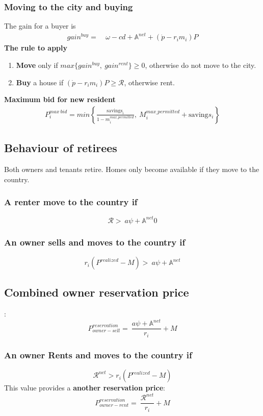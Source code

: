 {\subsubsection{Moving to the city and  buying}
The gain for a buyer is 
\begin{align}
gain^{buy}=&\ \omega-cd+\mathbb{A}^{net}+(\dot p-r_im_i)P   \nonumber
\end{align}
\textbf{The rule to apply}
\begin{enumerate}
    \item \textbf{Move} only if $max\{gain^{buy},\ gain^{rent}\} \ge 0$, otherwise do not move to the city.
    
    \item \textbf{Buy} a house if $(\dot p-r_im_i)P\ge  \mathcal{R}$, otherwise rent.
\end{enumerate}
\textbf{Maximum bid for new  resident}
\begin{align}
P_i^{max\ bid}= min \left\{\frac{\mathrm{savings}_i}{1-m_i^{max\_permitted}},\  M_i^{max\_permitted} + \mathrm{saving}s_i  \right\}   \nonumber  
\end{align}


\subsection{Behaviour of  retirees}
Both owners and tenants retire. Homes only become available if they move to the country. 
\subsubsection{A renter move to the country if} 
\[\mathcal{R} > \ a\psi+ \mathbb{A}^{net}0\]
\subsubsection{An owner sells and moves to the country if}
\[r_i(P^{realized}-M) >\ a\psi+ \mathbb{A}^{net}\] \subsection{ Combined owner reservation price}: 
\[P_{owner-sell}^{reservation} =\ \frac{a\psi+ \mathbb{A}^{net}}{r_i}+M \]

\subsubsection{An owner Rents and moves to the country if} 
\[\mathcal{R}^{net}>r_i(P^{realized}-M)\]
This value provides a \textbf{another reservation price}: 
\[P_{owner-rent}^{reservation} =\ \frac{\mathcal{R}^{net}}{r_i}+M \]

}
